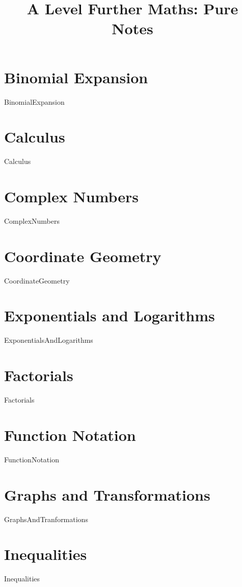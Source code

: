 \documentclass{report}
\title{A Level Further Maths: Pure Notes}
\date{ }
\begin{document}
    \maketitle
    \tableofcontents
    \newpage

	\chapter{Binomial Expansion}
	{BinomialExpansion}

	\chapter{Calculus}
	{Calculus}

	\chapter{Complex Numbers}
	{ComplexNumbers}

	\chapter{Coordinate Geometry}
	{CoordinateGeometry}

	\chapter{Exponentials and Logarithms}
	{ExponentialsAndLogarithms}

	\chapter{Factorials}
	{Factorials}

	\chapter{Function Notation}
	{FunctionNotation}

	\chapter{Graphs and Transformations}
	{GraphsAndTranformations}

	\chapter{Inequalities}
	{Inequalities}
\end{document}
